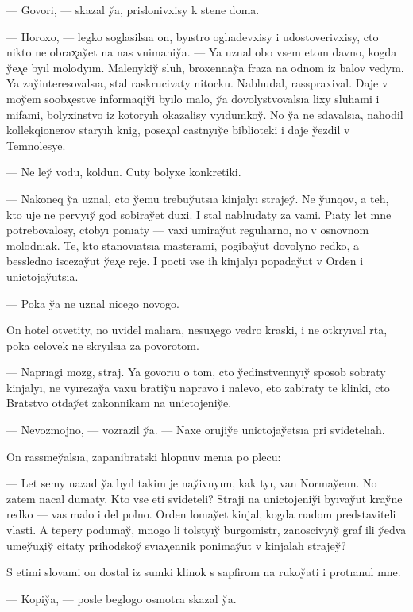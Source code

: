 \documentclass[10pt]{book}
\begin{document}
— Govori, — skazal y̆a, prislonivxisy k stene doma.

— Horoxo, — legko soglasilsıa on, byıstro oglıadevxisy i udostoverivxisy, cto nikto ne obrax̨ay̆et na nas vnimaniy̆a. — Ya uznal obo vsem etom davno, kogda y̆ex̨e byıl molodyım. Malenykiy̆ sluh, broxennay̆a fraza na odnom iz balov vedym. Ya zay̆interesovalsıa, stal raskrucivaty nitocku. Nablıudal, rasspraxival. Daje v moy̆em soobx̨estve informaqiy̆i byılo malo, y̆a dovolystvovalsıa lixy sluhami i mifami, bolyxinstvo iz kotoryıh okazalisy vyıdumkoy̆. No y̆a ne sdavalsıa, nahodil kollekqionerov staryıh knig, posex̨al castnyıy̆e biblioteki i daje y̆ezdil v Temnolesye.

— Ne ley̆ vodu, koldun. Cuty bolyxe konkretiki.

— Nakoneq y̆a uznal, cto y̆emu trebuy̆utsıa kinjalyı strajey̆. Ne y̆unqov, a teh, kto uje ne pervyıy̆ god sobiray̆et duxi. I stal nablıudaty za vami. Pıaty let mne potrebovalosy, ctobyı ponıaty — vaxi umiray̆ut regulıarno, no v osnovnom molodnıak. Te, kto stanovıatsıa masterami, pogibay̆ut dovolyno redko, a bessledno iscezay̆ut y̆ex̨e reje. I pocti vse ih kinjalyı popaday̆ut v Orden i unictojay̆utsıa.

— Poka y̆a ne uznal nicego novogo.

On hotel otvetity, no uvidel malıara, nesux̨ego vedro kraski, i ne otkryıval rta, poka celovek ne skryılsıa za povorotom.

— Naprıagi mozg, straj. Ya govorıu o tom, cto y̆edinstvennyıy̆ sposob sobraty kinjalyı, ne vyırezay̆a vaxu bratiy̆u napravo i nalevo, eto zabiraty te klinki, cto Bratstvo otday̆et zakonnikam na unictojeniy̆e.

— Nevozmojno, — vozrazil y̆a. — Naxe orujiy̆e unictojay̆etsıa pri svidetelıah.

On rassmey̆alsıa, zapanibratski hlopnuv menıa po plecu:

— Let semy nazad y̆a byıl takim je nay̆ivnyım, kak tyı, van Normay̆enn. No zatem nacal dumaty. Kto vse eti svideteli? Straji na unictojeniy̆i byıvay̆ut kray̆ne redko — vas malo i del polno. Orden lomay̆et kinjal, kogda rıadom predstaviteli vlasti. A tepery podumay̆, mnogo li tolstyıy̆ burgomistr, zanoscivyıy̆ graf ili y̆edva umey̆ux̨iy̆ citaty prihodskoy̆ svıax̨ennik ponimay̆ut v kinjalah strajey̆?

S etimi slovami on dostal iz sumki klinok s sapfirom na rukoy̆ati i protıanul mne.

— Kopiy̆a, — posle beglogo osmotra skazal y̆a.
\end{document}
